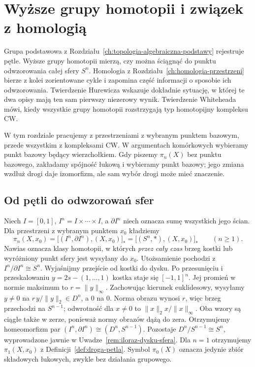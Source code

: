 \chapter{Wyższe grupy homotopii i związek z homologią}
\label{ch:wyzsza-homotopia}

\providecommand{\atlasref}[2]{#2}

Grupa podstawowa z Rozdziału~\ref{ch:topologia-algebraiczna-podstawy}
rejestruje pętle. Wyższe grupy homotopii mierzą, czy można
ściągnąć do punktu odwzorowania całej sfery $S^n$. Homologia z
Rozdziału~\ref{ch:homologia-przestrzeni} bierze z kolei
zorientowane cykle i zapomina część informacji o sposobie ich
odwzorowania. Twierdzenie Hurewicza wskazuje dokładnie sytuację,
w której te dwa opisy mają ten sam pierwszy niezerowy wynik.
Twierdzenie Whiteheada mówi, kiedy wszystkie grupy homotopii
rozstrzygają typ homotopijny kompleksu CW.

W tym rozdziale pracujemy z przestrzeniami z wybranym punktem bazowym,
przede wszystkim z kompleksami CW. W argumentach komórkowych
wybieramy punkt bazowy będący wierzchołkiem. Gdy piszemy
$\pi_n(X)$ bez punktu bazowego, zakładamy spójność łukową i
wybieramy punkt bazowy; jego zmiana wzdłuż drogi daje izomorfizm, ale
sam wybór drogi może mieć znaczenie.

\section{Od pętli do odwzorowań sfer}
\label{sec:grupy-pi-n}

\begin{definicja}
\label{def:pi-n}
Niech $I=[0,1]$, $I^n=I\times\cdots\times I$, a
$\partial I^n$ niech oznacza sumę wszystkich jego ścian.
Dla przestrzeni z wybranym punktem $x_0$ kładziemy
\[
 \pi_n(X,x_0)
 =\big[(I^n,\partial I^n),(X,x_0)\big]_*
 =\big[(S^n,*),(X,x_0)\big]_*
 \qquad(n\geq1).
\]
Nawias oznacza klasy homotopii, w których
\emph{przez cały czas} brzeg kostki lub wyróżniony
punkt sfery jest wysyłany do $x_0$.
Utożsamienie pochodzi z $I^n/\partial I^n\cong S^n$.
Wyjaśnijmy przejście od kostki do dysku. Po przesunięciu
i przeskalowaniu $y=2s-(1,\ldots,1)$ kostka staje się
$[-1,1]^n$. Jej promień w normie maksimum to
$r=\|y\|_\infty$. Zachowując kierunek euklidesowy, wysyłamy
$y\ne0$ na $r\,y/\|y\|_2\in D^n$, a $0$ na $0$.
Norma obrazu wynosi $r$, więc brzeg przechodzi na $S^{n-1}$;
odwrotność dla $x\ne0$ to $\|x\|_2x/\|x\|_\infty$.
Oba wzory są ciągłe także w zerze, ponieważ normy obrazów
dążą do zera. Otrzymujemy homeomorfizm par
$(I^n,\partial I^n)\cong(D^n,S^{n-1})$.
Pozostaje $D^n/S^{n-1}\cong S^n$, wyprowadzone jawnie
w Uwadze~\ref{rem:iloraz-dysku-sfera}.
Dla $n=1$ otrzymujemy $\pi_1(X,x_0)$ z
Definicji~\ref{def:droga-petla}. Symbol $\pi_0(X)$
oznacza jedynie zbiór składowych łukowych,
zwykle bez działania grupowego.
\end{definicja}

